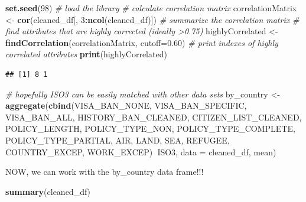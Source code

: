 \documentclass[]{article}
\newenvironment{Shaded}{\begin{snugshade}}{\end{snugshade}}
\newcommand{\CommentTok}[1]{\textcolor[rgb]{0.56,0.35,0.01}{\textit{#1}}}
\newcommand{\DataTypeTok}[1]{\textcolor[rgb]{0.13,0.29,0.53}{#1}}
\newcommand{\DecValTok}[1]{\textcolor[rgb]{0.00,0.00,0.81}{#1}}
\newcommand{\FloatTok}[1]{\textcolor[rgb]{0.00,0.00,0.81}{#1}}
\newcommand{\KeywordTok}[1]{\textcolor[rgb]{0.13,0.29,0.53}{\textbf{#1}}}
\newcommand{\NormalTok}[1]{#1}
\newcommand{\OperatorTok}[1]{\textcolor[rgb]{0.81,0.36,0.00}{\textbf{#1}}}
\newcommand{\StringTok}[1]{\textcolor[rgb]{0.31,0.60,0.02}{#1}}
\begin{document}
\begin{Shaded}
\begin{Highlighting}[]
\KeywordTok{set.seed}\NormalTok{(}\DecValTok{98}\NormalTok{)}
\CommentTok{# load the library}
\CommentTok{# calculate correlation matrix}
\NormalTok{correlationMatrix <-}\StringTok{ }\KeywordTok{cor}\NormalTok{(cleaned_df[, }\DecValTok{3}\OperatorTok{:}\KeywordTok{ncol}\NormalTok{(cleaned_df)])}
\CommentTok{# summarize the correlation matrix}
\CommentTok{# find attributes that are highly corrected (ideally >0.75)}
\NormalTok{highlyCorrelated <-}\StringTok{ }\KeywordTok{findCorrelation}\NormalTok{(correlationMatrix, }\DataTypeTok{cutoff=}\FloatTok{0.60}\NormalTok{)}
\CommentTok{# print indexes of highly correlated attributes}
\KeywordTok{print}\NormalTok{(highlyCorrelated)}
\end{Highlighting}
\end{Shaded}

\begin{verbatim}
## [1] 8 1
\end{verbatim}

\begin{Shaded}
\begin{Highlighting}[]
\CommentTok{# hopefully ISO3 can be easily matched with other data sets}
\NormalTok{by_country <-}\StringTok{ }\KeywordTok{aggregate}\NormalTok{(}\KeywordTok{cbind}\NormalTok{(VISA_BAN_NONE, VISA_BAN_SPECIFIC, VISA_BAN_ALL,}
\NormalTok{                              HISTORY_BAN_CLEANED,}
\NormalTok{                              CITIZEN_LIST_CLEANED, POLICY_LENGTH, POLICY_TYPE_NON, }
\NormalTok{                              POLICY_TYPE_COMPLETE, POLICY_TYPE_PARTIAL,}
\NormalTok{                              AIR, LAND, }
\NormalTok{                              SEA, REFUGEE, COUNTRY_EXCEP, WORK_EXCEP)}\OperatorTok{~}\NormalTok{ISO3, }\DataTypeTok{data =}\NormalTok{ cleaned_df, mean)}
\end{Highlighting}
\end{Shaded}

NOW, we can work with the by\_country data frame!!!

\begin{Shaded}
\begin{Highlighting}[]
\KeywordTok{summary}\NormalTok{(cleaned_df)}
\end{Highlighting}
\end{Shaded}
\end{document}

